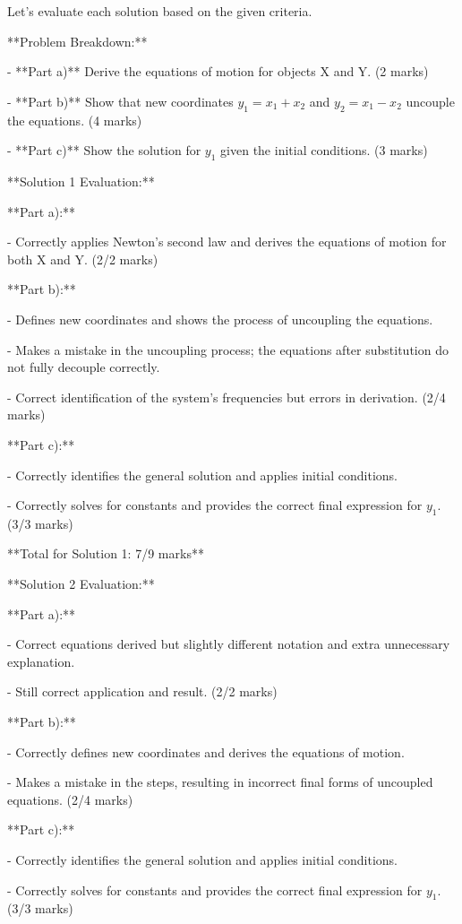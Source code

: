 \documentclass[a4paper,11pt]{article}
\begin{document}
Let's evaluate each solution based on the given criteria.

**Problem Breakdown:**

- **Part a)** Derive the equations of motion for objects X and Y. (2 marks)

- **Part b)** Show that new coordinates \( y_1 = x_1 + x_2 \) and \( y_2 = x_1 - x_2 \) uncouple the equations. (4 marks)

- **Part c)** Show the solution for \( y_1 \) given the initial conditions. (3 marks)

**Solution 1 Evaluation:**

**Part a):**

- Correctly applies Newton's second law and derives the equations of motion for both X and Y. (2/2 marks)

**Part b):**

- Defines new coordinates and shows the process of uncoupling the equations.

- Makes a mistake in the uncoupling process; the equations after substitution do not fully decouple correctly.

- Correct identification of the system’s frequencies but errors in derivation. (2/4 marks)

**Part c):**

- Correctly identifies the general solution and applies initial conditions.

- Correctly solves for constants and provides the correct final expression for \( y_1 \). (3/3 marks)

**Total for Solution 1: 7/9 marks**

**Solution 2 Evaluation:**

**Part a):**

- Correct equations derived but slightly different notation and extra unnecessary explanation.

- Still correct application and result. (2/2 marks)

**Part b):**

- Correctly defines new coordinates and derives the equations of motion.

- Makes a mistake in the steps, resulting in incorrect final forms of uncoupled equations. (2/4 marks)

**Part c):**

- Correctly identifies the general solution and applies initial conditions.

- Correctly solves for constants and provides the correct final expression for \( y_1 \). (3/3 marks)
\end{document}

